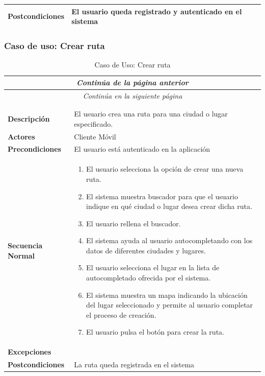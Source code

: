 \begin{longtable}{| p{4cm} | p{10cm} |}
\hline
\textbf{Postcondiciones} & 
El usuario queda registrado y autenticado en el sistema\\
\hline
\end{longtable}




\newpage
\subsubsection*{Caso de uso: Crear ruta}
\begin{longtable}{| p{4cm} | p{10cm} |}
\endfirsthead
\multicolumn{2}{c}{\textit{Continúa de la página anterior}}\\[12pt]
\hline
\endhead
\hline
\multicolumn{2}{c}{\textit{Continúa en la siguiente página}} \\
\endfoot
\hline
\caption{Caso de Uso: Crear ruta}\label{fig:1}\\
\endlastfoot


\hline
\multicolumn{2}{|c|}{\textbf{CU$<$03$>$ - Crear Ruta}} \\

\hline
\textbf{Descripción} &
El usuario crea una ruta para una ciudad o lugar especificado. \\

\hline
\textbf{Actores} &
Cliente Móvil\\

\hline
\textbf{Precondiciones} &
El usuario está autenticado en la aplicación\\

\hline
\textbf{Secuencia Normal} &\mbox{}\par\vspace{-\baselineskip}
\begin{enumerate}[leftmargin=0.7cm, topsep=0.1cm]
\item El usuario selecciona la opción de crear una nueva ruta.
\item El sistema muestra buscador para que el usuario indique en qué ciudad o lugar desea crear dicha ruta.
\item El usuario rellena el buscador.
\item El sistema ayuda al usuario autocompletando con los datos de diferentes ciudades y lugares.
\item El usuario selecciona el lugar en la lista de autocompletado ofrecida por el sistema.
\item El sistema muestra un mapa indicando la ubicación del lugar seleccionado y permite al usuario completar el proceso de creación.
\item El usuario pulsa el botón para crear la ruta.
\end{enumerate}\\

\hline
\textbf{Excepciones} &\mbox{}\par\vspace{-\baselineskip}
\\

\hline
\textbf{Postcondiciones} & 
La ruta queda registrada en el sistema\\
\hline
\end{longtable}




